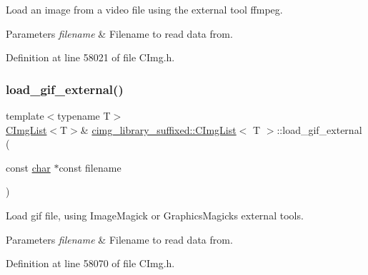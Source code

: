 Load an image from a video file using the external tool \textquotesingle{}ffmpeg\textquotesingle{}. 


\begin{DoxyParams}{Parameters}
{\em filename} & Filename to read data from. \\
\hline
\end{DoxyParams}


Definition at line 58021 of file C\+Img.\+h.

\mbox{\label{structcimg__library__suffixed_1_1CImgList_a222371272a0ca7a6d6d30a380bc0a92d}} 
\subsubsection{\texorpdfstring{load\+\_\+gif\+\_\+external()}{load\_gif\_external()}}
{\footnotesize\ttfamily template$<$typename T$>$ \\
\hyperlink{structcimg__library__suffixed_1_1CImgList}{C\+Img\+List}$<$T$>$\& \hyperlink{structcimg__library__suffixed_1_1CImgList}{cimg\+\_\+library\+\_\+suffixed\+::\+C\+Img\+List}$<$ T $>$\+::load\+\_\+gif\+\_\+external (\begin{DoxyParamCaption}\item[{const \hyperlink{classchar}{char} $\ast$const}]{filename }\end{DoxyParamCaption})\hspace{0.3cm}{\ttfamily [inline]}}



Load gif file, using Image\+Magick or Graphics\+Magick\textquotesingle{}s external tools. 


\begin{DoxyParams}{Parameters}
{\em filename} & Filename to read data from. \\
\hline
\end{DoxyParams}


Definition at line 58070 of file C\+Img.\+h.

\mbox{\label{structcimg__library__suffixed_1_1CImgList_aae55e9a79bf2f7e08108dd200f63bf2c}} 
